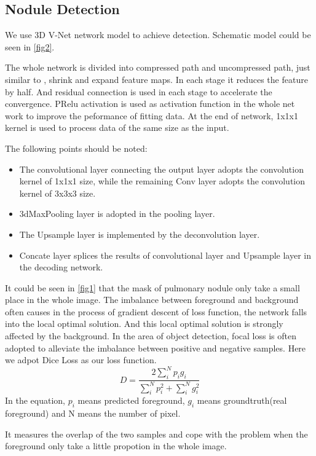 \documentclass[conference]{IEEEtran}
\begin{document}
\subsection{Nodule Detection}
We use 3D V-Net network\cite{1606.04797} model to achieve detection. Schematic model could be seen in \ref{fig2}. \par
The whole network is divided into compressed path and uncompressed path, just similar to \cite{1505.04597}, shrink and expand feature maps. In each stage it reduces the feature by half.
And residual connection is used in each stage to accelerate the convergence. PRelu activation \cite{1502.01852} is used as activation function in the whole net work to improve the peformance of fitting data.
At the end of network, 1x1x1 kernel is used to process data of the same size as the input.\par
The following points should be noted:
\begin{itemize}
    \item The convolutional layer connecting the output layer adopts the convolution kernel of 1x1x1 size, while the remaining Conv layer adopts the convolution kernel of 3x3x3 size.
    \item 3dMaxPooling layer is adopted in the pooling layer.
    \item The Upsample layer is implemented by the deconvolution layer.
    \item Concate layer splices the results of convolutional layer and Upsample layer in the decoding network.
\end{itemize}
It could be seen in \ref{fig1} that the mask of pulmonary nodule only take a small place in the whole image. The imbalance between foreground
and background often causes in the process of gradient descent of loss function, the network falls into the local optimal solution. And this local
optimal solution is strongly affected by the background. In the area of object detection, focal loss is often adopted to alleviate the imbalance between positive and negative samples.
Here we adpot Dice Loss as our loss function.
\begin{equation}D=\frac{2 \sum_{i}^{N} p_{i} g_{i}}{\sum_{i}^{N} p_{i}^{2}+\sum_{i}^{N} g_{i}^{2}}\end{equation}
In the equation, $p_{i}$ means predicted foreground, $g_{i}$ means groundtruth(real foreground) and N means the number of pixel.\par
It measures the overlap of the two samples and cope with the problem when the foreground only take a little propotion in the whole image.
\end{document}
